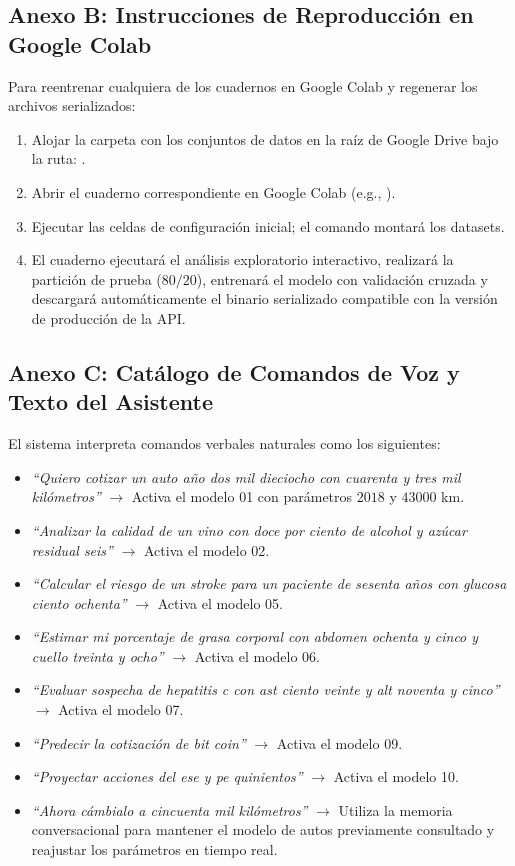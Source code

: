 \documentclass[12pt,letterpaper]{article}
\begin{document}
\subsection{Anexo B: Instrucciones de Reproducción en Google Colab}
Para reentrenar cualquiera de los cuadernos en Google Colab y regenerar los archivos serializados:
\begin{enumerate}[leftmargin=*]
    \item Alojar la carpeta con los conjuntos de datos en la raíz de Google Drive bajo la ruta: .
    \item Abrir el cuaderno correspondiente en Google Colab (e.g., ).
    \item Ejecutar las celdas de configuración inicial; el comando  montará los datasets.
    \item El cuaderno ejecutará el análisis exploratorio interactivo, realizará la partición de prueba ($80/20$), entrenará el modelo con validación cruzada y descargará automáticamente el binario serializado  compatible con la versión de producción de la API.
\end{enumerate}

\subsection{Anexo C: Catálogo de Comandos de Voz y Texto del Asistente}
El sistema interpreta comandos verbales naturales como los siguientes:
\begin{itemize}[leftmargin=*]
    \item \textit{``Quiero cotizar un auto año dos mil dieciocho con cuarenta y tres mil kilómetros''} $\to$ Activa el modelo 01 con parámetros $2018$ y $43000$ km.
    \item \textit{``Analizar la calidad de un vino con doce por ciento de alcohol y azúcar residual seis''} $\to$ Activa el modelo 02.
    \item \textit{``Calcular el riesgo de un stroke para un paciente de sesenta años con glucosa ciento ochenta''} $\to$ Activa el modelo 05.
    \item \textit{``Estimar mi porcentaje de grasa corporal con abdomen ochenta y cinco y cuello treinta y ocho''} $\to$ Activa el modelo 06.
    \item \textit{``Evaluar sospecha de hepatitis c con ast ciento veinte y alt noventa y cinco''} $\to$ Activa el modelo 07.
    \item \textit{``Predecir la cotización de bit coin''} $\to$ Activa el modelo 09.
    \item \textit{``Proyectar acciones del ese y pe quinientos''} $\to$ Activa el modelo 10.
    \item \textit{``Ahora cámbialo a cincuenta mil kilómetros''} $\to$ Utiliza la memoria conversacional para mantener el modelo de autos previamente consultado y reajustar los parámetros en tiempo real.
\end{itemize}
\end{document}
